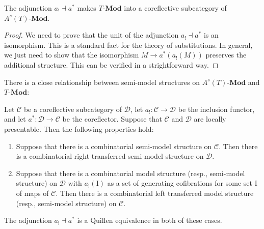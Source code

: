 \documentclass[reqno]{amsart}
\theoremstyle{definition}
\theoremstyle{remark}
\newcommand{\fs}[1]{\mathrm{#1}}
\newcommand{\cat}[1]{\mathcal{#1}}
\newcommand{\C}{\cat{C}}
\newcommand{\D}{\cat{D}}
\newcommand{\bcat}[1]{\mathbf{#1}}
\newcommand{\Mod}[1]{#1\text{-}\bcat{Mod}}
\newcommand{\I}{\fs{I}}
\numberwithin{figure}{section}
\begin{document}
\begin{prop}
The adjunction $a_! \dashv a^*$ makes $\Mod{T}$ into a coreflective subcategory of $\Mod{A^s(T)}$.
\end{prop}
\begin{proof}
We need to prove that the unit of the adjunction $a_! \dashv a^*$ is an isomorphism.
This is a standard fact for the theory of substitutions.
In general, we just need to show that the isomorphism $M \to a^*(a_!(M))$ preserves the additional structure.
This can be verified in a strightforward way.
\end{proof}

There is a close relationship between semi-model structures on $\Mod{A^s(T)}$ and $\Mod{T}$:

\begin{prop}
Let $\C$ be a coreflective subcategory of $\D$, let $a_! : \C \to \D$ be the inclusion functor, and let $a^* : \D \to \C$ be the coreflector.
Suppose that $\C$ and $\D$ are locally presentable.
Then the following properties hold:
\begin{enumerate}
\item \label{it:coref-model-right}
Suppose that there is a combinatorial semi-model structure on $\C$.
Then there is a combinatorial right transferred semi-model structure on $\D$.
\item \label{it:coref-model-left}
Suppose that there is a combinatorial model structure (resp., semi-model structure) on $\D$ with $a_!(\I)$ as a set of generating cofibrations for some set $\I$ of maps of $\C$.
Then there is a combinatorial left transferred model structure (resp., semi-model structure) on $\C$.
\end{enumerate}
The adjunction $a_! \dashv a^*$ is a Quillen equivalence in both of these cases.
\end{prop}
\end{document}
